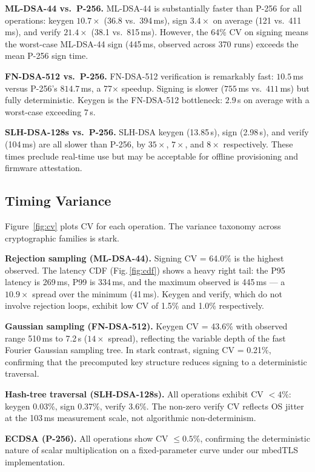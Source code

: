 \documentclass[iicol]{sn-jnl}
\begin{document}
\textbf{ML-DSA-44 vs.\ P-256.}
ML-DSA-44 is substantially faster than P-256 for all operations:
keygen $10.7\times$ (36.8 vs.\ 394\,ms), sign $3.4\times$ on average
(121 vs.\ 411\,ms), and verify $21.4\times$ (38.1 vs.\ 815\,ms).
However, the 64\% CV on signing means the worst-case ML-DSA-44 sign
(445\,ms, observed across 370 runs) exceeds the mean P-256 sign time.

\textbf{FN-DSA-512 vs.\ P-256.}
FN-DSA-512 verification is remarkably fast: $10.5$\,ms versus P-256's
$814.7$\,ms, a 77$\times$ speedup.
Signing is slower ($755$\,ms vs.\ $411$\,ms) but fully deterministic.
Keygen is the FN-DSA-512 bottleneck: $2.9$\,s on average with a worst-case
exceeding $7$\,s.

\textbf{SLH-DSA-128s vs.\ P-256.}
SLH-DSA keygen (13.85\,s), sign (2.98\,s), and verify (104\,ms) are all
slower than P-256, by $35\times$, $7\times$, and $8\times$ respectively.
These times preclude real-time use but may be acceptable for offline
provisioning and firmware attestation.

\subsection{Timing Variance}
\label{sec:variance}

Figure~\ref{fig:cv} plots CV for each operation.
The variance taxonomy across cryptographic families is stark.

\textbf{Rejection sampling (ML-DSA-44).}
Signing CV = 64.0\% is the highest observed.
The latency CDF (Fig.\,\ref{fig:cdf}) shows a heavy right tail: the P95
latency is 269\,ms, P99 is 334\,ms, and the maximum observed is 445\,ms ---
a $10.9\times$ spread over the minimum (41\,ms).
Keygen and verify, which do not involve rejection loops, exhibit low
CV of 1.5\% and 1.0\% respectively.

\textbf{Gaussian sampling (FN-DSA-512).}
Keygen CV = 43.6\% with observed range 510\,ms to 7.2\,s ($14\times$ spread),
reflecting the variable depth of the fast Fourier Gaussian sampling tree.
In stark contrast, signing CV = 0.21\%, confirming that the precomputed key
structure reduces signing to a deterministic traversal.

\textbf{Hash-tree traversal (SLH-DSA-128s).}
All operations exhibit CV $< 4$\%: keygen 0.03\%, sign 0.37\%, verify 3.6\%.
The non-zero verify CV reflects OS jitter at the 103\,ms
measurement scale, not algorithmic non-determinism.

\textbf{ECDSA (P-256).}
All operations show CV $\leq 0.5$\%, confirming the deterministic nature
of scalar multiplication on a fixed-parameter curve under our mbedTLS
implementation.
\end{document}
